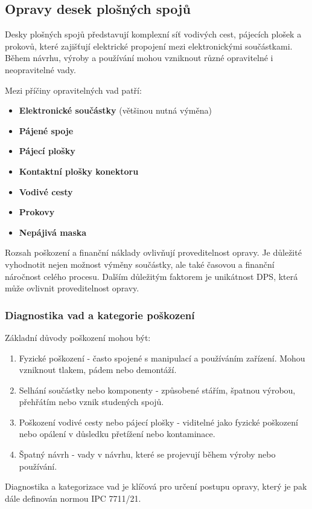 \subsection{Opravy desek plošných spojů}

Desky plošných spojů představují komplexní síť vodivých cest, pájecích plošek a prokovů, které zajišťují elektrické propojení mezi elektronickými součástkami. Během návrhu, výroby a používání mohou vzniknout různé opravitelné i neopravitelné vady. 

Mezi příčiny opravitelných vad patří:

\begin{itemize}
    \item \textbf{Elektronické součástky} (většinou nutná výměna)
    \item \textbf{Pájené spoje}
    \item \textbf{Pájecí plošky}
    \item \textbf{Kontaktní plošky konektoru}
    \item \textbf{Vodivé cesty}
    \item \textbf{Prokovy}
    \item \textbf{Nepájivá maska}
\end{itemize}

Rozsah poškození a finanční náklady ovlivňují proveditelnost opravy. Je důležité vyhodnotit nejen možnost výměny součástky, ale také časovou a finanční náročnost celého procesu. Dalším důležitým faktorem je unikátnost DPS, která může ovlivnit proveditelnost opravy. 

\subsubsection{Diagnostika vad a kategorie poškození}

Základní důvody poškození mohou být:

\begin{enumerate}
    \item Fyzické poškození - často spojené s manipulací a používáním zařízení. Mohou vzniknout tlakem, pádem nebo demontáží.
    \item Selhání součástky nebo komponenty - způsobené stářím, špatnou výrobou, přehřátím nebo vznik studených spojů.
    \item Poškození vodivé cesty nebo pájecí plošky - viditelné jako fyzické poškození nebo opálení v důsledku přetížení nebo kontaminace.
    \item Špatný návrh - vady v návrhu, které se projevují během výroby nebo používání.
\end{enumerate}

Diagnostika a kategorizace vad je klíčová pro určení postupu opravy, který je pak dále definován normou IPC 7711/21.

